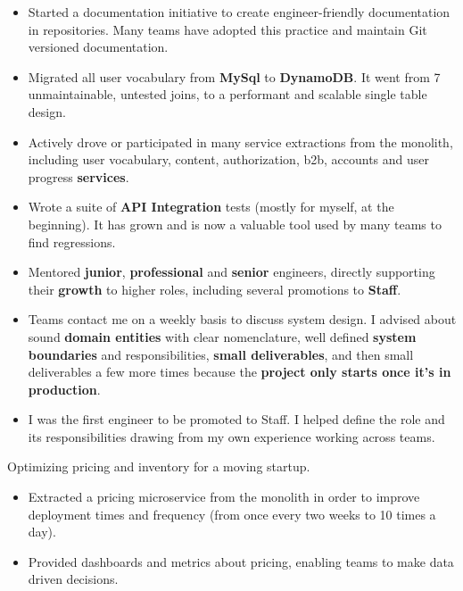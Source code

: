 \documentclass[10pt,a4paper,ragged2e,withhyper]{altacv}
\newcommand{\accentbold}[1]{\textbf{\textcolor{accent}{#1}}}
\begin{document}
\begin{paracol}{2}
{\begin{itemize}
\item Started a documentation initiative to create engineer-friendly documentation in repositories. Many teams have adopted this practice and maintain Git versioned documentation.
\item Migrated all user vocabulary from \accentbold{MySql} to \accentbold{DynamoDB}. It went from 7 unmaintainable, untested joins, to a performant and scalable single table design.
\item Actively drove or participated in many service extractions from the monolith, including user vocabulary, content, authorization, b2b, accounts and user progress \accentbold{services}.
\item Wrote a suite of \accentbold{API Integration} tests (mostly for myself, at the beginning). It has grown and is now a valuable tool used by many teams to find regressions.
\item Mentored \accentbold{junior}, \accentbold{professional} and \accentbold{senior} engineers, directly supporting their \accentbold{growth} to higher roles, including several promotions to \accentbold{Staff}.
\item Teams contact me on a weekly basis to discuss system design. I advised about sound \accentbold{domain entities} with clear nomenclature, well defined \accentbold{system boundaries} and responsibilities, \accentbold{small deliverables}, and then small deliverables a few more times because the \accentbold{project only starts once it's in production}.
\item I was the first engineer to be promoted to Staff. I helped define the role and its responsibilities drawing from my own experience working across teams.
\end{itemize}
}

\divider


{\RaggedRight
Optimizing pricing and inventory for a moving startup.

\medskip

\begin{itemize}
\item Extracted a pricing microservice from the monolith in order to improve deployment times and frequency (from once every two weeks to 10 times a day).
\item Provided dashboards and metrics about pricing, enabling teams to make data driven decisions.
\end{itemize}
}


\end{paracol}
\end{document}
